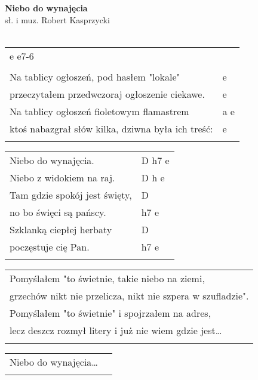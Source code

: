 \documentclass[a5paper]{article}
\begin{document}


\noindent
\fontsize{12pt}{15pt}\selectfont
\textbf{Niebo do wynajęcia} \\
\fontsize{8pt}{10pt}\selectfont
sł. i muz. Robert Kasprzycki \\ \\
\fontsize{10pt}{12pt}\selectfont
{}
\begin{tabular}{@{}p{8.50cm}p{3cm}@{}}
\noindent
e e7-6  \\ \\
Na tablicy ogłoszeń, pod hasłem "lokale" & e \\
przeczytałem przedwczoraj ogłoszenie ciekawe. & e \\		
Na tablicy ogłoszeń fioletowym flamastrem & a e \\
ktoś nabazgrał słów kilka, dziwna była ich treść: & e \\ \\
\end{tabular}

\noindent
\begin{tabular}{@{}p{7.50cm}p{3cm}@{}}
Niebo do wynajęcia. & D h7 e \\
Niebo z widokiem na raj.	& D h e\\
Tam gdzie spokój jest święty, & D \\
no bo święci są pańscy. & h7 e \\
Szklanką ciepłej herbaty & D \\
poczęstuje cię Pan. & h7 e \\ \\
\end{tabular}

\noindent
\begin{tabular}{@{}p{9.50cm}@{}}
Pomyślałem "to świetnie, takie niebo na ziemi, \\
grzechów nikt nie przelicza, nikt nie szpera w szufladzie". \\
Pomyślałem "to świetnie" i spojrzałem na adres, \\
lecz deszcz rozmył litery i już nie wiem gdzie jest… \\ \\
\end{tabular}

\noindent
\begin{tabular}{@{}p{7.50cm}p{3cm}@{}}
Niebo do wynajęcia… \\ \\
\end{tabular}
\end{document}
